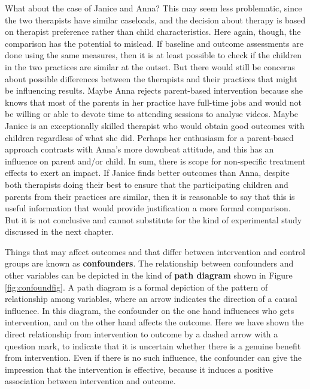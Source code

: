 \documentclass{krantz}
\begin{document}
What about the case of Janice and Anna? This may seem less problematic, since the two therapists have similar caseloads, and the decision about therapy is based on therapist preference rather than child characteristics. Here again, though, the comparison has the potential to mislead. If baseline and outcome assessments are done using the same measures, then it is at least possible to check if the children in the two practices are similar at the outset. But there would still be concerns about possible differences between the therapists and their practices that might be influencing results. Maybe Anna rejects parent-based intervention because she knows that most of the parents in her practice have full-time jobs and would not be willing or able to devote time to attending sessions to analyse videos. Maybe Janice is an exceptionally skilled therapist who would obtain good outcomes with children regardless of what she did. Perhaps her enthusiasm for a parent-based approach contrasts with Anna's more downbeat attitude, and this has an influence on parent and/or child. In sum, there is scope for non-specific treatment effects to exert an impact. If Janice finds better outcomes than Anna, despite both therapists doing their best to ensure that the participating children and parents from their practices are similar, then it is reasonable to say that this is useful information that would provide justification a more formal comparison. But it is not conclusive and cannot substitute for the kind of experimental study discussed in the next chapter.

Things that may affect outcomes and that differ between intervention and control groups are known as \textbf{confounders}. The relationship between confounders and other variables can be depicted in the kind of \textbf{path diagram} shown in Figure \ref{fig:confoundfig}. A path diagram is a formal depiction of the pattern of relationship among variables, where an arrow indicates the direction of a causal influence. In this diagram, the confounder on the one hand influences who gets intervention, and on the other hand affects the outcome. Here we have shown the direct relationship from intervention to outcome by a dashed arrow with a question mark, to indicate that it is uncertain whether there is a genuine benefit from intervention. Even if there is no such influence, the confounder can give the impression that the intervention is effective, because it induces a positive association between intervention and outcome.
\end{document}
